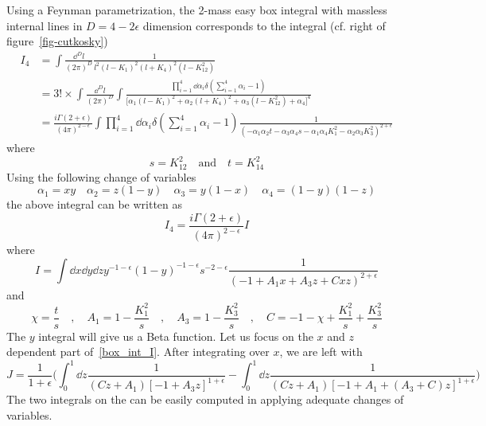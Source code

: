 Using a Feynman parametrization, the 2-mass easy box integral with massless internal lines in $D=4-2\epsilon$ dimension corresponds to the integral (cf. right of figure~\ref{fig-cutkosky})
\begin{equation}
\begin{split}
I_4 & = \int\frac{\dd^D l }{(2\pi)^D}\frac{1}{ l^2(l-K_1)^2(l+K_4)^2 (l-K_{12}^2)}
\\
&=
3!\times\int\frac{\dd^D l }{(2\pi)^D}
\int
\frac{\prod_{i=1}^4\dd\alpha_i \delta(\sum_{i=1}^4\alpha_i -1)}{\big[\alpha_1(l-K_1)^2 + \alpha_2(l+K_4)^2 + \alpha_3 (l-K_{12}^2) + \alpha_4\big]^4}
\\
&= \frac{i\Gamma(2+\epsilon)}{(4\pi)^{2-\epsilon}}\int\prod_{i=1}^4\dd\alpha_i \delta(\sum_{i=1}^4\alpha_i -1)\frac{1}{(-\alpha_1\alpha_2 t - \alpha_3\alpha_4 s 
-\alpha_1\alpha_4 K_1^2 - \alpha_2\alpha_3 K_{3}^2)^{2+\epsilon}}
\end{split}
\end{equation}
where
\begin{equation}
s=K_{12}^2 \quad\mathrm{and}\quad t=K_{14}^2
\end{equation}
Using the following change of variables
\begin{equation}
\alpha_1 = xy \quad
\alpha_2 = z(1-y)\quad
\alpha_3 = y(1-x)\quad
\alpha_4 = (1-y)(1-z)
\end{equation}
the above integral can be written as
\begin{equation}
I_4 = \frac{i\Gamma(2+\epsilon)}{(4\pi)^{2-\epsilon}} I
\end{equation}
where
\begin{equation}\label{box_int_I}
I = \int\dd x\dd y \dd z y^{-1-\epsilon}(1-y)^{-1-\epsilon}s^{-2-\epsilon}
\frac{1}{(-1 + A_1 x + A_3 z + C xz)^{2+\epsilon}}
\end{equation}
and
\begin{equation}
\chi = \frac{t}{s}\quad, \quad
A_1 = 1 - \frac{K_1^2}{s}\quad, \quad
A_3 = 1 - \frac{K_3^2}{s} \quad,\quad
C = -1 - \chi  + \frac{K_1^2}{s} + \frac{K_3^2}{s}
\end{equation}
The $y$ integral will give us a Beta function.
Let us focus on the $x$ and $z$ dependent part of~\cref{box_int_I}.
After integrating over $x$, we are left with 
\begin{equation}
J = \frac{1}{1+\epsilon}\Big(\int^1_0\dd z\frac{1}{(Cz + A_1)[-1 + A_3z]^{1+\epsilon}} - 
\int^1_0\dd z\frac{1}{(Cz + A_1)[-1 + A_1  + (A_3 + C)z]^{1+\epsilon} }\Big)
\end{equation}
The two integrals on the \rhs can be easily computed in applying adequate changes of variables.
